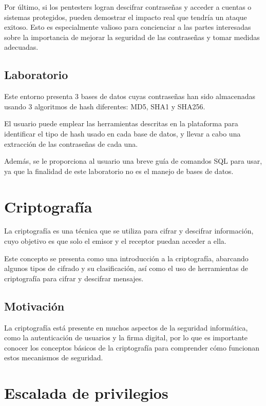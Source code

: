             Por último, si los pentesters logran descifrar contraseñas y acceder a cuentas o sistemas protegidos, pueden demostrar el impacto real que tendría un ataque exitoso. Esto es especialmente valioso para concienciar a las partes interesadas sobre la importancia de mejorar la seguridad de las contraseñas y tomar medidas adecuadas.

        \subsection{Laboratorio}

            Este entorno presenta 3 bases de datos cuyas contraseñas han sido almacenadas usando 3 algoritmos de hash diferentes: MD5, SHA1 y SHA256.

            El usuario puede emplear las herramientas descritas en la plataforma para identificar el tipo de hash usado en cada base de datos, y llevar a cabo una extracción de las contraseñas de cada una.

            Además, se le proporciona al usuario una breve guía de comandos SQL para usar, ya que la finalidad de este laboratorio no es el manejo de bases de datos.


    \section{Criptografía}

        La criptografía es una técnica que se utiliza para cifrar y descifrar información, cuyo objetivo es que solo el emisor y el receptor puedan acceder a ella.

        Este concepto se presenta como una introducción a la criptografía, abarcando algunos tipos de cifrado y su clasificación, así como el uso de herramientas de criptografía para cifrar y descifrar mensajes.

        \subsection{Motivación}

            La criptografía está presente en muchos aspectos de la seguridad informática, como la autenticación de usuarios y la firma digital, por lo que es importante conocer los conceptos básicos de la criptografía para comprender cómo funcionan estos mecanismos de seguridad.


    \section{Escalada de privilegios}
    
